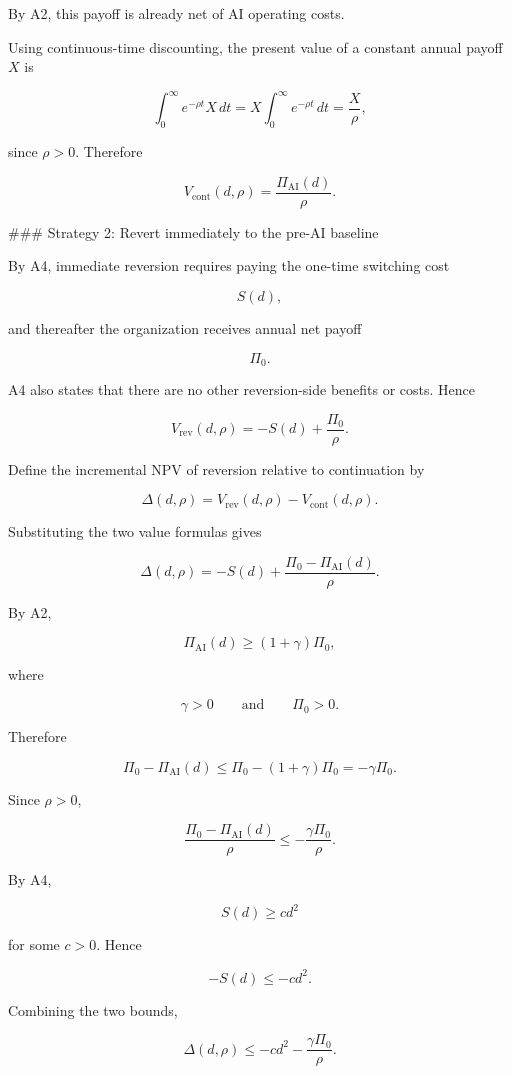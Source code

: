 By A2, this payoff is already net of AI operating costs.

Using continuous-time discounting, the present value of a constant annual payoff \(X\) is

\[
\int_0^\infty e^{-\rho t}X\,dt
=
X\int_0^\infty e^{-\rho t}\,dt
=
\frac{X}{\rho},
\]

since \(\rho>0\). Therefore

\[
V_{\mathrm{cont}}(d,\rho)
=
\frac{\Pi_{\mathrm{AI}}(d)}{\rho}.
\]

### Strategy 2: Revert immediately to the pre-AI baseline

By A4, immediate reversion requires paying the one-time switching cost

\[
S(d),
\]

and thereafter the organization receives annual net payoff

\[
\Pi_0.
\]

A4 also states that there are no other reversion-side benefits or costs. Hence

\[
V_{\mathrm{rev}}(d,\rho)
=
-S(d)+\frac{\Pi_0}{\rho}.
\]

Define the incremental NPV of reversion relative to continuation by

\[
\Delta(d,\rho)
=
V_{\mathrm{rev}}(d,\rho)-V_{\mathrm{cont}}(d,\rho).
\]

Substituting the two value formulas gives

\[
\Delta(d,\rho)
=
-S(d)+\frac{\Pi_0-\Pi_{\mathrm{AI}}(d)}{\rho}.
\]

By A2,

\[
\Pi_{\mathrm{AI}}(d)\ge (1+\gamma)\Pi_0,
\]

where

\[
\gamma>0
\qquad\text{and}\qquad
\Pi_0>0.
\]

Therefore

\[
\Pi_0-\Pi_{\mathrm{AI}}(d)
\le
\Pi_0-(1+\gamma)\Pi_0
=
-\gamma\Pi_0.
\]

Since \(\rho>0\),

\[
\frac{\Pi_0-\Pi_{\mathrm{AI}}(d)}{\rho}
\le
-\frac{\gamma\Pi_0}{\rho}.
\]

By A4,

\[
S(d)\ge c d^2
\]

for some \(c>0\). Hence

\[
-S(d)\le -c d^2.
\]

Combining the two bounds,

\[
\Delta(d,\rho)
\le
-cd^2-\frac{\gamma\Pi_0}{\rho}.
\]

